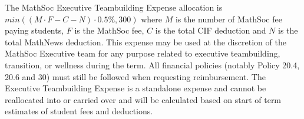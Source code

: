 The MathSoc Executive Teambuilding Expense allocation is $min((M\cdot F - C - N)\cdot 0.5\%, 300)$ where $M$ is the number of MathSoc fee paying students, $F$ is the MathSoc fee, $C$ is the total CIF deduction and $N$ is the total MathNews deduction. This expense may be used at the discretion of the MathSoc Executive team for any purpose related to executive teambuilding, transition, or wellness during the term. All financial policies (notably Policy 20.4, 20.6 and 30) must still be followed when requesting reimbursement. The Executive Teambuilding Expense is a standalone expense and cannot be reallocated into or carried over and will be calculated based on start of term estimates of student fees and deductions.

